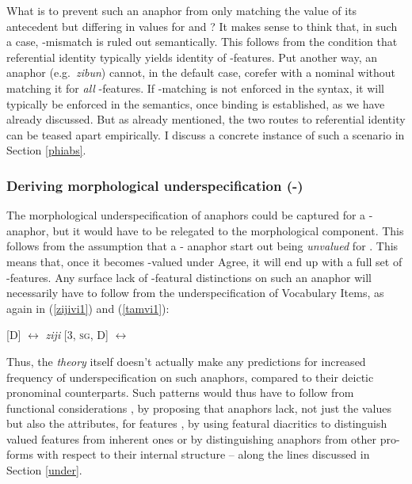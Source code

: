 \documentclass[output=paper, modfonts, nonflat]{langsci/langscibook}
\begin{document}
What is to prevent such an anaphor from only matching the \person{}
value of its antecedent but differing in values for \num{} and
\gender? It makes sense to think that, in such a case, \ph-mismatch is
ruled out semantically. This follows from the condition that
referential identity typically yields identity of \ph-features. Put
another way, an anaphor (e.g.\ \textit{zibun}) cannot, in the default
case, corefer with a nominal without matching it for \textit{all}
\ph-features. If \ph-matching is not enforced in the syntax, it will
typically be enforced in the semantics, once binding is established,
as we have already discussed. But as already mentioned, the two routes
to referential identity can be teased apart empirically. I discuss a
concrete instance of such a scenario in Section \ref{phiabs}. 



\subsubsection{Deriving morphological underspecification (\nul-\person)}

The morphological underspecification of anaphors could be captured for
a \nul-\person{} anaphor, but it would have to be relegated to the
morphological component. This follows from the assumption that a
\nul-\person{} anaphor start out being \emph{unvalued} for
\person. This means that, once it becomes \ph-valued under Agree, it
will end up with a full set of \ph-features. Any surface lack of
\ph-featural distinctions on such an anaphor will necessarily have to
follow from the underspecification of Vocabulary Items, as again in
(\ref{zijivi1}) and (\ref{tamvi1}): 

\ea\label{zijivi1} \textsc{[D]}
$\leftrightarrow$ \textit{ziji} \ex\label{tamvi1} \textsc{[3, sg, D]}
$\leftrightarrow$ \taan{} \z

\noindent Thus, the \emph{theory} itself doesn't actually make any predictions
for increased frequency of underspecification on such anaphors,
compared to their deictic pro\-nominal counterparts. Such patterns would
thus have to follow from functional considerations
\citep{roorwyn:2011}, by proposing that anaphors lack, not just the
values but also the attributes, for \ph{} features
\citep{kratzer:2009}, by using featural diacritics to distinguish
valued features from inherent ones \citep{roorwyn:2011} or by
distinguishing anaphors from other pro-forms with respect to their
internal structure \citep{heinat:2008, dechainewiltschko:2012} --
along the lines discussed in Section \ref{under}.
\end{document}
